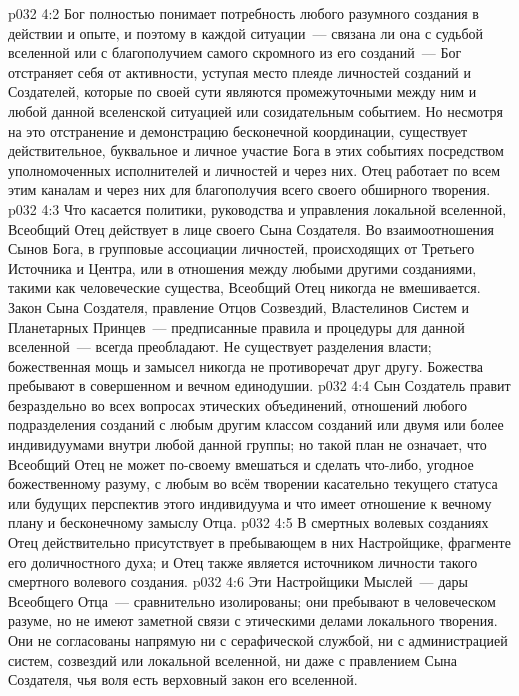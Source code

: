 \vs p032 4:2 Бог полностью понимает потребность любого разумного создания в действии и опыте, и поэтому в каждой ситуации~--- связана ли она с судьбой вселенной или с благополучием самого скромного из его созданий~--- Бог отстраняет себя от активности, уступая место плеяде личностей созданий и Создателей, которые по своей сути являются промежуточными между ним и любой данной вселенской ситуацией или созидательным событием. Но несмотря на это отстранение и демонстрацию бесконечной координации, существует действительное, буквальное и личное участие Бога в этих событиях посредством уполномоченных исполнителей и личностей и через них. Отец работает по всем этим каналам и через них для благополучия всего своего обширного творения.
\vs p032 4:3 \pc Что касается политики, руководства и управления локальной вселенной, Всеобщий Отец действует в лице своего Сына Создателя. Во взаимоотношения Сынов Бога, в групповые ассоциации личностей, происходящих от Третьего Источника и Центра, или в отношения между любыми другими созданиями, такими как человеческие существа, Всеобщий Отец никогда не вмешивается. Закон Сына Создателя, правление Отцов Созвездий, Властелинов Систем и Планетарных Принцев~--- предписанные правила и процедуры для данной вселенной~--- всегда преобладают. Не существует разделения власти; божественная мощь и замысел никогда не противоречат друг другу. Божества пребывают в совершенном и вечном единодушии.
\vs p032 4:4 Сын Создатель правит безраздельно во всех вопросах этических объединений, отношений любого подразделения созданий с любым другим классом созданий или двумя или более индивидуумами внутри любой данной группы; но такой план не означает, что Всеобщий Отец не может по\hyp{}своему вмешаться и сделать что\hyp{}либо, угодное божественному разуму, с любым  во всём творении касательно текущего статуса или будущих перспектив этого индивидуума и что имеет отношение к вечному плану и бесконечному замыслу Отца.
\vs p032 4:5 \pc В смертных волевых созданиях Отец действительно присутствует в пребывающем в них Настройщике, фрагменте его доличностного духа; и Отец также является источником личности такого смертного волевого создания.
\vs p032 4:6 \pc Эти Настройщики Мыслей~--- дары Всеобщего Отца~--- сравнительно изолированы; они пребывают в человеческом разуме, но не имеют заметной связи с этическими делами локального творения. Они не согласованы напрямую ни с серафической службой, ни с администрацией систем, созвездий или локальной вселенной, ни даже с правлением Сына Создателя, чья воля есть верховный закон его вселенной.
